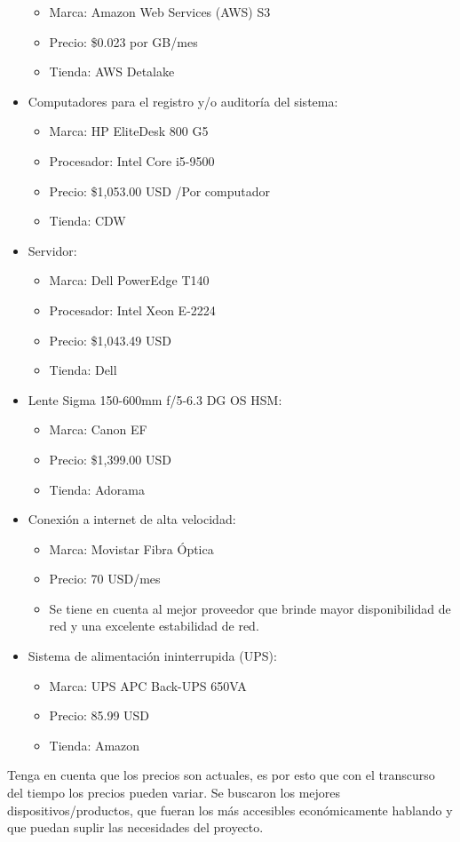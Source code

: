 \begin{itemize}
    \begin{itemize}
        \item Marca: Amazon Web Services (AWS) S3
        \item Precio: \$0.023 por GB/mes
        \item Tienda: AWS Detalake
    \end{itemize}
    \item Computadores para el registro y/o auditoría del sistema:
    \begin{itemize}
        \item Marca: HP EliteDesk 800 G5
        \item Procesador: Intel Core i5-9500
        \item Precio: \$1,053.00 USD /Por computador
        \item Tienda: CDW
    \end{itemize}
    \item Servidor:
    \begin{itemize}
        \item Marca: Dell PowerEdge T140
        \item Procesador: Intel Xeon E-2224
        \item Precio: \$1,043.49 USD
        \item Tienda: Dell
    \end{itemize}
    \item Lente Sigma 150-600mm f/5-6.3 DG OS HSM:
    \begin{itemize}
        \item Marca: Canon EF
        \item Precio: \$1,399.00 USD
        \item Tienda: Adorama
    \end{itemize}
    \item Conexión a internet de alta velocidad:
    \begin{itemize}
        \item Marca: Movistar Fibra Óptica
        \item Precio: 70 USD/mes
        \item Se tiene en cuenta al mejor proveedor que brinde mayor disponibilidad de red y una excelente estabilidad de red.
    \end{itemize}
    \item Sistema de alimentación ininterrupida (UPS):
    \begin{itemize}
        \item Marca: UPS APC Back-UPS 650VA
        \item Precio: 85.99 USD
        \item Tienda: Amazon 
    \end{itemize}
\end{itemize}

Tenga en cuenta que los precios son actuales, es por esto que con el transcurso del tiempo los precios pueden variar. Se buscaron los mejores dispositivos/productos, que fueran los más accesibles económicamente hablando y que puedan suplir las necesidades del proyecto.
